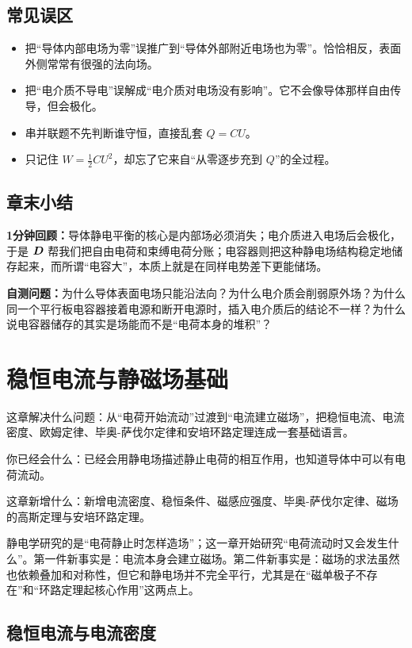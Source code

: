\documentclass[lang=cn,11pt]{elegantbook}
\newcommand{\bridge}[1]{\begin{note}#1\end{note}}
\newcommand{\chapterroadmap}[3]{%
\begin{introduction}
  \item {\heiti 这章解决什么问题：}#1
  \item {\heiti 你已经会什么：}#2
  \item {\heiti 这章新增什么：}#3
\end{introduction}}
\newcommand{\summaryline}[1]{\par\noindent\textbf{1分钟回顾：}#1\par}
\newcommand{\chapterselfcheck}[1]{\par\noindent\textbf{自测问题：}#1\par}
\begin{document}
\section{常见误区}

\begin{itemize}
  \item 把“导体内部电场为零”误推广到“导体外部附近电场也为零”。恰恰相反，表面外侧常常有很强的法向场。
  \item 把“电介质不导电”误解成“电介质对电场没有影响”。它不会像导体那样自由传导，但会极化。
  \item 串并联题不先判断谁守恒，直接乱套 \(Q=CU\)。
  \item 只记住 \(W=\frac12 CU^2\)，却忘了它来自“从零逐步充到 \(Q\)”的全过程。
\end{itemize}

\section{章末小结}

\summaryline{导体静电平衡的核心是内部场必须消失；电介质进入电场后会极化，于是 \(\vb*{D}\) 帮我们把自由电荷和束缚电荷分账；电容器则把这种静电场结构稳定地储存起来，而所谓“电容大”，本质上就是在同样电势差下更能储场。}
\chapterselfcheck{为什么导体表面电场只能沿法向？为什么电介质会削弱原外场？为什么同一个平行板电容器接着电源和断开电源时，插入电介质后的结论不一样？为什么说电容器储存的其实是场能而不是“电荷本身的堆积”？}

\chapter{稳恒电流与静磁场基础}

\chapterroadmap
{从“电荷开始流动”过渡到“电流建立磁场”，把稳恒电流、电流密度、欧姆定律、毕奥-萨伐尔定律和安培环路定理连成一套基础语言。}
{已经会用静电场描述静止电荷的相互作用，也知道导体中可以有电荷流动。}
{新增电流密度、稳恒条件、磁感应强度、毕奥-萨伐尔定律、磁场的高斯定理与安培环路定理。}

\bridge{静电学研究的是“电荷静止时怎样造场”；这一章开始研究“电荷流动时又会发生什么”。第一件新事实是：电流本身会建立磁场。第二件新事实是：磁场的求法虽然也依赖叠加和对称性，但它和静电场并不完全平行，尤其是在“磁单极子不存在”和“环路定理起核心作用”这两点上。}

\section{稳恒电流与电流密度}
\end{document}
